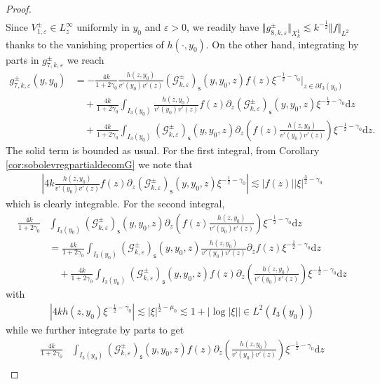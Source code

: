 \documentclass[11pt,reqno]{amsproc}
\theoremstyle{definition}
\numberwithin{equation}{section}
\newcommand{\G}{{\mathcal{G}}}
\newcommand{\s}{{\mathsf{s}}}
\renewcommand{\d}{\mathrm{d}}
\newcommand{\ep}{\varepsilon}
\begin{document}
\begin{proof}
\begin{align*}
\end{align*}
Since $V_{1,\ep}^\pm\in L^\infty_z$ uniformly in $y_0$ and $\ep>0$, we readily have $\Vert g_{8,k,\ep}^\pm \Vert_{X_k^1}\lesssim k^{-\frac12}\Vert f \Vert_{L^2}$ thanks to the vanishing properties of $h(\cdot, y_0)$. On the other hand, integrating by parts in $g_{7,k,\ep}^\pm$ we reach
\begin{align*}
g_{7,k,\ep}^\pm(y,y_0) &= -\frac{4k}{1+2\gamma_0} \frac{h(z,y_0)}{v'(y_0)v'(z)}\left( \G_{k,\ep}^\pm \right)_\s(y,y_0,z) f(z)\xi^{-\frac12-\gamma_0} \Big|_{z\in \partial I_3(y_0)} \\
&\quad +\frac{4k}{1+2\gamma_0}\int_{I_3(y_0)} \frac{h(z,y_0)}{v'(y_0)v'(z)}f(z) \partial_z \left( \G_{k,\ep}^\pm \right)_\s(y,y_0,z) \xi^{-\frac12-\gamma_0} \d z \\
&\quad + \frac{4k}{1+2\gamma_0}\int_{I_3(y_0)} \left( \G_{k,\ep}^\pm \right)_\s(y,y_0,z) \partial_z \left( f(z)  \frac{h(z,y_0)}{v'(y_0)v'(z)} \right)\xi^{-\frac12-\gamma_0} \d z.
\end{align*}
The solid term is bounded as usual. For the first integral, from Corollary \ref{cor:sobolevregpartialdecomG} we note that 
\begin{align*}
\left|4k \frac{h(z,y_0)}{v'(y_0)v'(z)}f(z) \partial_z \left( \G_{k,\ep}^\pm \right)_\s(y,y_0,z) \xi^{-\frac12-\gamma_0} \right| \lesssim |f(z)||\xi|^{\frac32-\gamma_0}
\end{align*}
which is clearly integrable. For the second integral,
\begin{align*}
\frac{4k}{1+2\gamma_0}&\int_{I_3(y_0)} \left( \G_{k,\ep}^\pm \right)_\s(y,y_0,z) \partial_z \left( f(z)  \frac{h(z,y_0)}{v'(y_0)v'(z)} \right)\xi^{-\frac12-\gamma_0} \d z \\
&= \frac{4k}{1+2\gamma_0}\int_{I_3(y_0)} \left( \G_{k,\ep}^\pm \right)_\s(y,y_0,z)   \frac{h(z,y_0)}{v'(y_0)v'(z)} \partial_z f(z)\xi^{-\frac12-\gamma_0} \d z \\
&\quad + \frac{4k}{1+2\gamma_0}\int_{I_3(y_0)} \left( \G_{k,\ep}^\pm \right)_\s(y,y_0,z) f(z)   \partial_z \left( \frac{h(z,y_0)}{v'(y_0)v'(z)} \right)\xi^{-\frac12-\gamma_0} \d z
\end{align*}
with 
\begin{align*}
\left| 4k h(z,y_0) \xi^{-\frac12-\gamma_0} \right| \lesssim |\xi|^{\frac12-\mu_0}\lesssim 1 + |\log|\xi| |\in L^2(I_3(y_0))
\end{align*}
while we further integrate by parts to get
\begin{align*}
\frac{4k}{1+2\gamma_0}&\int_{I_3(y_0)} \left( \G_{k,\ep}^\pm \right)_\s(y,y_0,z) f(z)   \partial_z \left( \frac{h(z,y_0)}{v'(y_0)v'(z)} \right)\xi^{-\frac12-\gamma_0} \d z \\

\end{align*}
\end{proof}
\end{document}
